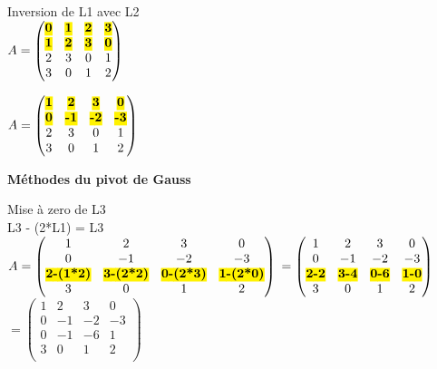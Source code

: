 \vspace{10mm} %
Inversion de L1 avec L2\\

$
A =
\begin{pmatrix}
  \hl{\textbf{0}} & \hl{\textbf{1}} & \hl{\textbf{2}} & \hl{\textbf{3}} \\
  \hl{\textbf{1}} & \hl{\textbf{2}} & \hl{\textbf{3}} & \hl{\textbf{0}} \\
  2 & 3 & 0 & 1 \\
  3 & 0 & 1 & 2 \\
\end{pmatrix}
$
\vspace{5mm} %

$
A =
\begin{pmatrix}
  \hl{\textbf{1}} & \hl{\textbf{2}} & \hl{\textbf{3}} & \hl{\textbf{0}} \\
  \hl{\textbf{0}} & \hl{\textbf{-1}} & \hl{\textbf{-2}} & \hl{\textbf{-3}} \\
  2 & 3 & 0 & 1 \\
  3 & 0 & 1 & 2 \\
\end{pmatrix}
$

\vspace{12mm} %
\textbf{Méthodes du pivot de Gauss } \\
\vspace{2mm} %

Mise à zero de L3 \\
L3 - (2*L1) = L3 \\

$
A =
\begin{pmatrix}
  1 & 2 & 3 & 0 \\
  0 & -1 & -2 & -3 \\
  \hl{\textbf{2-(1*2)}} & \hl{\textbf{3-(2*2)}} & \hl{\textbf{0-(2*3)}} & \hl{\textbf{1-(2*0)}} \\
  3 & 0 & 1 & 2 \\
\end{pmatrix}
$
$
=
\begin{pmatrix}
  1 & 2 & 3 & 0 \\
  0 & -1 & -2 & -3 \\
  \hl{\textbf{2-2}} & \hl{\textbf{3-4}} & \hl{\textbf{0-6}} & \hl{\textbf{1-0}} \\
  3 & 0 & 1 & 2 \\
\end{pmatrix}
$
$
=
\begin{pmatrix}
  1 & 2 & 3 & 0 \\
  0 & -1 & -2 & -3 \\
  0 & -1 & -6 & 1 \\
  3 & 0 & 1 & 2 \\
\end{pmatrix}
$

